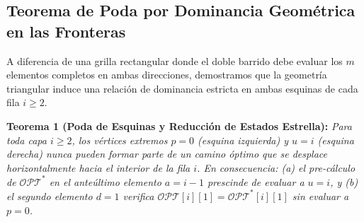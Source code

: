 \subsection{Teorema de Poda por Dominancia Geométrica en las Fronteras}

A diferencia de una grilla rectangular donde el doble barrido debe evaluar los $m$ elementos completos en ambas direcciones, demostramos que la geometría triangular induce una relación de dominancia estricta en ambas esquinas de cada fila $i \geq 2$.

\textbf{Teorema 1 (Poda de Esquinas y Reducción de Estados Estrella):} \textit{Para toda capa $i \geq 2$, los vértices extremos $p = 0$ (esquina izquierda) y $u = i$ (esquina derecha) nunca pueden formar parte de un camino óptimo que se desplace horizontalmente hacia el interior de la fila $i$. En consecuencia: (a) el pre-cálculo de $\mathcal{OPT}^*$ en el anteúltimo elemento $a = i-1$ prescinde de evaluar a $u = i$, y (b) el segundo elemento $d = 1$ verifica $\mathcal{OPT}[i][1] = \mathcal{OPT}^*[i][1]$ sin evaluar a $p = 0$.}

